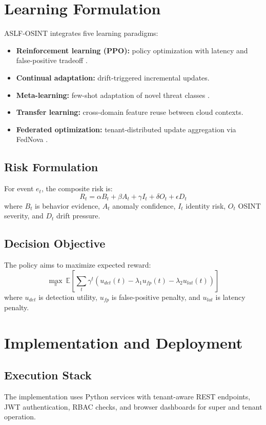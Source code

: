 \documentclass[conference]{IEEEtran}
\begin{document}
\section{Learning Formulation}
ASLF-OSINT integrates five learning paradigms:
\begin{itemize}
  \item \textbf{Reinforcement learning (PPO):} policy optimization with latency and false-positive tradeoff \cite{schulman2017ppo}.
  \item \textbf{Continual adaptation:} drift-triggered incremental updates.
  \item \textbf{Meta-learning:} few-shot adaptation of novel threat classes \cite{snell2017prototypical,finn2017maml}.
  \item \textbf{Transfer learning:} cross-domain feature reuse between cloud contexts.
  \item \textbf{Federated optimization:} tenant-distributed update aggregation via FedNova \cite{li2020fednova}.
\end{itemize}

\subsection{Risk Formulation}
For event $e_t$, the composite risk is:
\begin{equation}
R_t = \alpha B_t + \beta A_t + \gamma I_t + \delta O_t + \epsilon D_t
\end{equation}
where $B_t$ is behavior evidence, $A_t$ anomaly confidence, $I_t$ identity risk, $O_t$ OSINT severity, and $D_t$ drift pressure.

\subsection{Decision Objective}
The policy aims to maximize expected reward:
\begin{equation}
\max_{\pi} \ \mathbb{E}\left[\sum_{t} \gamma^t \left( u_{det}(t) - \lambda_1 u_{fp}(t) - \lambda_2 u_{lat}(t)\right)\right]
\end{equation}
where $u_{det}$ is detection utility, $u_{fp}$ is false-positive penalty, and $u_{lat}$ is latency penalty.

\section{Implementation and Deployment}
\subsection{Execution Stack}
The implementation uses Python services with tenant-aware REST endpoints, JWT authentication, RBAC checks, and browser dashboards for super and tenant operation.
\end{document}

